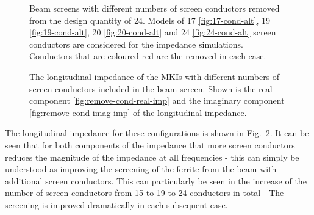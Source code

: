 \begin{figure}
{\label{fig:24-cond-alt}
}
\caption{Beam screens with different numbers of screen conductors removed from the design quantity of 24. Models of 17 \ref {fig:17-cond-alt}, 19 \ref{fig:19-cond-alt}, 20 \ref{fig:20-cond-alt} and 24 \ref{fig:24-cond-alt} screen conductors are considered for the impedance simulations. Conductors that are coloured red are the removed in each case.}
\label{fig:mki-take-away-cond-alt}
\end{figure}

\begin{figure}
\caption{The longitudinal impedance of the MKIs with different numbers of screen conductors included in the beam screen. Shown is the real component \ref{fig:remove-cond-real-imp} and the imaginary component \ref{fig:remove-cond-imag-imp} of the longitudinal impedance.}
\label{fig:remove-cond-impedance}
\end{figure}

The longitudinal impedance for these configurations is shown in Fig.~\ref{fig:remove-cond-impedance}. It can be seen that for both components of the impedance that more screen conductors reduces the magnitude of the impedance at all frequencies - this can simply be understood as improving the screening of the ferrite from the beam with additional screen conductors. This can particularly be seen in the increase of the number of screen conductors from 15 to 19 to 24 conductors in total - The screening is improved dramatically in each subsequent case. 

